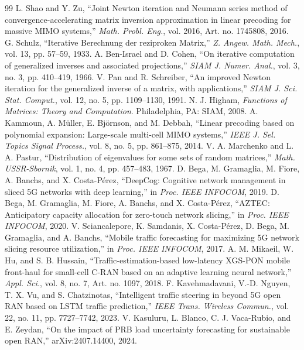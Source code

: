 \begin{thebibliography}{99}
 L. Shao and Y. Zu, ``Joint Newton iteration and Neumann series method of convergence-accelerating matrix inversion approximation in linear precoding for massive MIMO systems,'' \emph{Math. Probl. Eng.}, vol. 2016, Art. no. 1745808, 2016.
 G. Schulz, ``Iterative Berechnung der reziproken Matrix,'' \emph{Z. Angew. Math. Mech.}, vol. 13, pp. 57--59, 1933.
 A. Ben-Israel and D. Cohen, ``On iterative computation of generalized inverses and associated projections,'' \emph{SIAM J. Numer. Anal.}, vol. 3, no. 3, pp. 410--419, 1966.
 V. Pan and R. Schreiber, ``An improved Newton iteration for the generalized inverse of a matrix, with applications,'' \emph{SIAM J. Sci. Stat. Comput.}, vol. 12, no. 5, pp. 1109--1130, 1991.
 N. J. Higham, \emph{Functions of Matrices: Theory and Computation}. Philadelphia, PA: SIAM, 2008.
 A. Kammoun, A. M\"uller, E. Bj\"ornson, and M. Debbah, ``Linear precoding based on polynomial expansion: Large-scale multi-cell MIMO systems,'' \emph{IEEE J. Sel. Topics Signal Process.}, vol. 8, no. 5, pp. 861--875, 2014.
 V. A. Marchenko and L. A. Pastur, ``Distribution of eigenvalues for some sets of random matrices,'' \emph{Math. USSR-Sbornik}, vol. 1, no. 4, pp. 457--483, 1967.
 D. Bega, M. Gramaglia, M. Fiore, A. Banchs, and X. Costa-P\'erez, ``DeepCog: Cognitive network management in sliced 5G networks with deep learning,'' in \emph{Proc. IEEE INFOCOM}, 2019.
 D. Bega, M. Gramaglia, M. Fiore, A. Banchs, and X. Costa-P\'erez, ``AZTEC: Anticipatory capacity allocation for zero-touch network slicing,'' in \emph{Proc. IEEE INFOCOM}, 2020.
 V. Sciancalepore, K. Samdanis, X. Costa-P\'erez, D. Bega, M. Gramaglia, and A. Banchs, ``Mobile traffic forecasting for maximizing 5G network slicing resource utilization,'' in \emph{Proc. IEEE INFOCOM}, 2017.
 A. M. Mikaeil, W. Hu, and S. B. Hussain, ``Traffic-estimation-based low-latency XGS-PON mobile front-haul for small-cell C-RAN based on an adaptive learning neural network,'' \emph{Appl. Sci.}, vol. 8, no. 7, Art. no. 1097, 2018.
 F. Kavehmadavani, V.-D. Nguyen, T. X. Vu, and S. Chatzinotas, ``Intelligent traffic steering in beyond 5G open RAN based on LSTM traffic prediction,'' \emph{IEEE Trans. Wireless Commun.}, vol. 22, no. 11, pp. 7727--7742, 2023.
 V. Kasuluru, L. Blanco, C. J. Vaca-Rubio, and E. Zeydan, ``On the impact of PRB load uncertainty forecasting for sustainable open RAN,'' arXiv:2407.14400, 2024.

\end{thebibliography}
